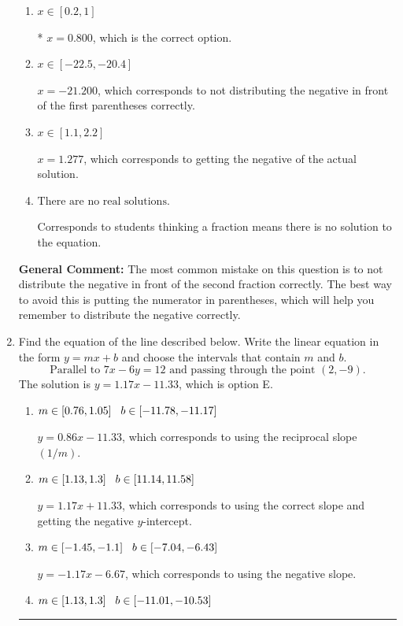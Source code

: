 \documentclass{extbook}[14pt]
\newcommand{\litem}[1]{\item #1

\rule{\textwidth}{0.4pt}}
\begin{document}
\begin{enumerate}
{\begin{enumerate}[label=\Alph*.]
$x = 21.200$, which corresponds to not distributing the negative in front of the second parentheses correctly.
\item \( x \in [0.2, 1] \)

* $x = 0.800$, which is the correct option.
\item \( x \in [-22.5, -20.4] \)

$x = -21.200$, which corresponds to not distributing the negative in front of the first parentheses correctly.
\item \( x \in [1.1, 2.2] \)

$x = 1.277$, which corresponds to getting the negative of the actual solution.
\item \( \text{There are no real solutions.} \)

Corresponds to students thinking a fraction means there is no solution to the equation.
\end{enumerate}

\textbf{General Comment:} The most common mistake on this question is to not distribute the negative in front of the second fraction correctly. The best way to avoid this is putting the numerator in parentheses, which will help you remember to distribute the negative correctly.
}
\litem{
Find the equation of the line described below. Write the linear equation in the form $ y=mx+b $ and choose the intervals that contain $m$ and $b$.
\[ \text{Parallel to } 7 x - 6 y = 12 \text{ and passing through the point } (2, -9). \]The solution is \( y = 1.17x - 11.33 \), which is option E.\begin{enumerate}[label=\Alph*.]
\item \( m \in [0.76, 1.05] \hspace*{3mm} b \in [-11.78, -11.17] \)

 $y = 0.86x - 11.33$, which corresponds to using the reciprocal slope $(1/m)$.
\item \( m \in [1.13, 1.3] \hspace*{3mm} b \in [11.14, 11.58] \)

 $y = 1.17x + 11.33$, which corresponds to using the correct slope and getting the negative $y$-intercept.
\item \( m \in [-1.45, -1.1] \hspace*{3mm} b \in [-7.04, -6.43] \)

 $y = -1.17x - 6.67$, which corresponds to using the negative slope.
\item \( m \in [1.13, 1.3] \hspace*{3mm} b \in [-11.01, -10.53] \)


\end{enumerate}}
\end{enumerate}
\end{document}
